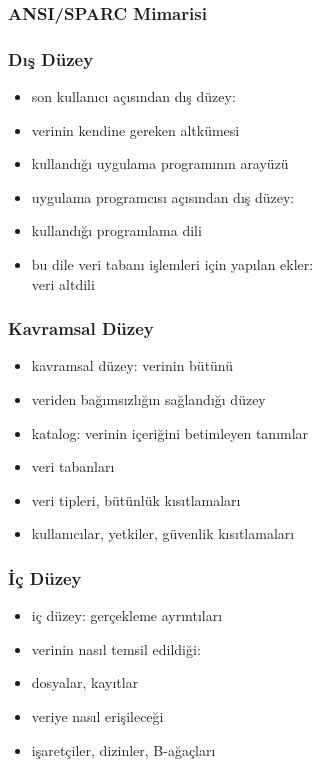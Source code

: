 \documentclass[dvipsnames]{beamer}
\theoremstyle{plain}
\begin{document}
\begin{frame}
  \frametitle{ANSI/SPARC Mimarisi}

  \begin{center}
  \end{center}
\end{frame}

\begin{frame}
  \frametitle{Dış Düzey}

  \begin{itemize}
    \item son kullanıcı açısından dış düzey:
    \item verinin kendine gereken altkümesi
    \item kullandığı uygulama programının arayüzü
    

    \pause
    \bigskip
    \item uygulama programcısı açısından dış düzey:
    \item kullandığı programlama dili
    \item bu dile veri tabanı işlemleri için yapılan ekler:\\
       \alert{veri altdili}
  
  \end{itemize}
\end{frame}

\begin{frame}
  \frametitle{Kavramsal Düzey}

  \begin{itemize}
    \item kavramsal düzey: verinin bütünü
    \item veriden bağımsızlığın sağlandığı düzey

    \bigskip
    \item \alert{katalog}: verinin içeriğini betimleyen tanımlar
      \item veri tabanları
      \item veri tipleri, bütünlük kısıtlamaları
      \item kullanıcılar, yetkiler, güvenlik kısıtlamaları
  \end{itemize}
\end{frame}

\begin{frame}
  \frametitle{İç Düzey}

  \begin{itemize}
    \item iç düzey: gerçekleme ayrıntıları

    \medskip
    \item verinin nasıl temsil edildiği:
    \medskip
      \item dosyalar, kayıtlar
    
    \smallskip
    \item veriye nasıl erişileceği
    \item işaretçiler, dizinler, B-ağaçları
  \end{itemize}
\end{frame}
\end{document}
